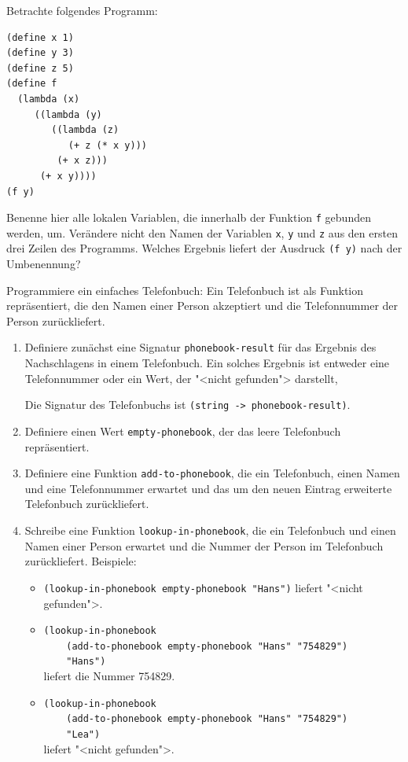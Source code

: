 \begin{aufgabe}
  Betrachte folgendes Programm:

\begin{lstlisting}
(define x 1)
(define y 3)
(define z 5)
(define f
  (lambda (x)   
     ((lambda (y)
        ((lambda (z)
           (+ z (* x y)))
         (+ x z)))
      (+ x y))))
(f y)
\end{lstlisting}

  Benenne hier alle lokalen Variablen, die innerhalb der Funktion
  \lstinline{f} gebunden werden, um. Verändere nicht den Namen der
  Variablen \lstinline{x}, \lstinline{y} und \lstinline{z} aus den ersten drei Zeilen
  des Programms.  Welches Ergebnis liefert
  der Ausdruck \lstinline{(f y)} nach der Umbenennung?
\end{aufgabe}

\begin{aufgabe}
  Programmiere ein einfaches Telefonbuch: Ein Telefonbuch ist
  als Funktion repräsentiert, die den Namen einer Person akzeptiert
  und die Telefonnummer der Person zurückliefert.

  \begin{enumerate}
  \item Definiere zunächst eine Signatur
    \lstinline{phonebook-result} für das Ergebnis des Nachschlagens in einem
    Telefonbuch. Ein solches Ergebnis ist entweder eine Telefonnummer
    oder ein Wert, der "<nicht gefunden"> darstellt,

    Die Signatur des Telefonbuchs ist  \lstinline{(string -> phonebook-result)}.
  \item Definiere einen Wert \lstinline{empty-phonebook}, der das leere
    Telefonbuch repräsentiert.
  \item Definiere eine Funktion 
    \lstinline{add-to-phonebook}, die ein Telefonbuch, einen Namen
    und eine Telefonnummer erwartet und das um den neuen Eintrag
    erweiterte
    Telefonbuch zurückliefert.
  \item Schreibe eine Funktion \lstinline{lookup-in-phonebook},
    die ein Telefonbuch und einen Namen einer Person erwartet und die
    Nummer der Person im Telefonbuch zurückliefert.
    Beispiele:
    \begin{itemize}
    \item \lstinline{(lookup-in-phonebook empty-phonebook "Hans")} liefert
      "<nicht gefunden">.
    \item \lstinline{(lookup-in-phonebook} \\
      \lstinline{    (add-to-phonebook empty-phonebook "Hans" "754829")}\\
      \lstinline{    "Hans")} \\
      liefert die Nummer 754829.
    \item \lstinline{(lookup-in-phonebook}\\
      \lstinline{    (add-to-phonebook empty-phonebook "Hans" "754829")}\\
      \lstinline{    "Lea")}\\
      liefert "<nicht gefunden">.
    \end{itemize}
  \end{enumerate}
\end{aufgabe}

